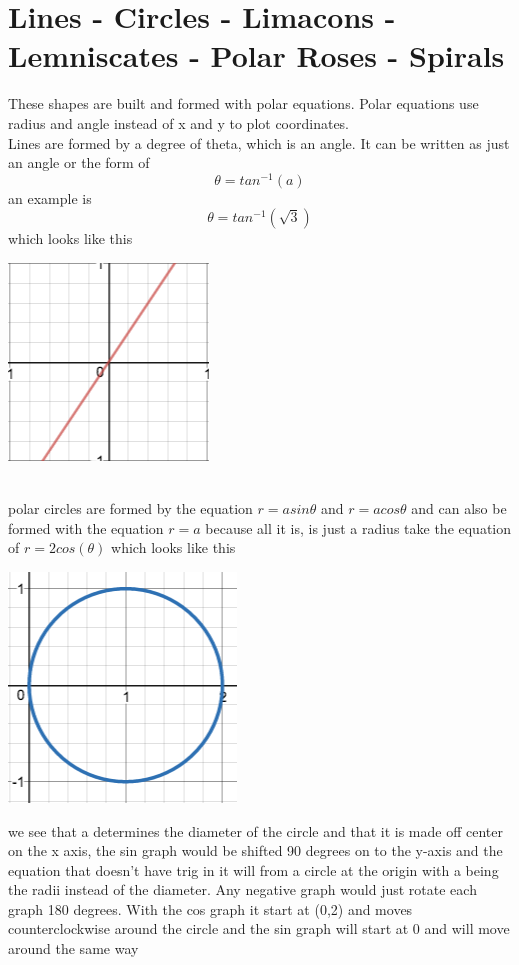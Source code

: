 \documentclass[a4paper,openright, 14pt]{article}
\begin{document}
\section*{Lines - Circles - Limacons - Lemniscates - Polar Roses - Spirals} These shapes are built and formed with polar equations. Polar equations use radius and angle instead of x and y to plot coordinates.
\\Lines are formed by a degree of theta, which is an angle. It can be written as just an angle or the form of $$\theta=tan^{-1}(a)$$
an example is $$\theta=tan^{-1}(\sqrt{3})$$ which looks like this 
\begin{center}
\includegraphics[width = 5 cm, height = 5 cm]{line.png}
\end{center}
\\polar circles are formed by the equation $r=asin\theta$ and $r=acos\theta$ and can also be formed with the equation $r=a$ because all it is, is just a radius take the equation of $r=2cos(\theta)$ which looks like this \begin{center}
\includegraphics[width = 5 cm, height = 5 cm]{circle.png}
\end{center}
we see that a determines the diameter of the circle and that it is made off center on the x axis, the sin graph would be shifted 90 degrees on to the y-axis and the equation that doesn't have trig in it will from a circle at the origin with a being the radii instead of the diameter. Any negative graph would just rotate each graph 180 degrees. With the cos graph it start at (0,2) and moves counterclockwise around the circle and the sin graph will start at 0 and will move around the same way
\end{document}
